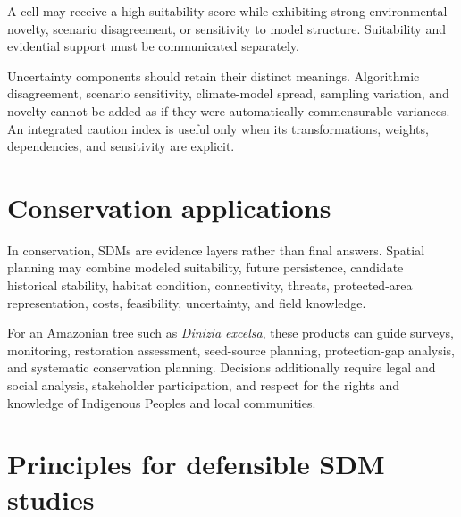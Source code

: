 \begin{atencao}[title={\faExclamationTriangle\quad High suitability is not high confidence}]
A cell may receive a high suitability score while exhibiting strong environmental novelty, scenario disagreement, or sensitivity to model structure. Suitability and evidential support must be communicated separately.
\end{atencao}

Uncertainty components should retain their distinct meanings. Algorithmic disagreement, scenario sensitivity, climate-model spread, sampling variation, and novelty cannot be added as if they were automatically commensurable variances. An integrated caution index is useful only when its transformations, weights, dependencies, and sensitivity are explicit.

\section{Conservation applications}

In conservation, SDMs are evidence layers rather than final answers. Spatial planning may combine modeled suitability, future persistence, candidate historical stability, habitat condition, connectivity, threats, protected-area representation, costs, feasibility, uncertainty, and field knowledge.

For an Amazonian tree such as \textit{Dinizia excelsa}, these products can guide surveys, monitoring, restoration assessment, seed-source planning, protection-gap analysis, and systematic conservation planning. Decisions additionally require legal and social analysis, stakeholder participation, and respect for the rights and knowledge of Indigenous Peoples and local communities.

\section{Principles for defensible SDM studies}

